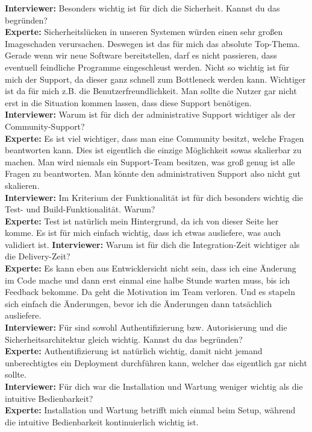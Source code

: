 \begin{center}
\begin{figure}[H]
    \centering
    \label{fig:CEA}
\end{figure}	
\end{center}
\newpage
\resetlinenumber
\begin{linenumbers}
    \textbf{Interviewer:} Besonders wichtig ist für dich die Sicherheit. Kannst du das begründen?\\
    \textbf{Experte:} Sicherheitslücken in unseren Systemen würden einen sehr großen Imageschaden verursachen. Deswegen ist das für mich das absolute Top-Thema. Gerade wenn wir neue Software bereitstellen, darf es nicht passieren, dass eventuell feindliche Programme eingeschleust werden. Nicht so wichtig ist für mich der Support, da dieser ganz schnell zum Bottleneck werden kann. Wichtiger ist da für mich z.B. die Benutzerfreundlichkeit. Man sollte die Nutzer gar nicht erst in die Situation kommen lassen, dass diese Support benötigen.\\
    \textbf{Interviewer:} Warum ist für dich der administrative Support wichtiger als der Community-Support?\\
    \textbf{Experte:} Es ist viel wichtiger, dass man eine Community besitzt, welche Fragen beantworten kann. Dies ist eigentlich die einzige Möglichkeit sowas skalierbar zu machen. Man wird niemals ein Support-Team besitzen, was groß genug ist alle Fragen zu beantworten. Man könnte den administrativen Support also nicht gut skalieren.\\
    \textbf{Interviewer:} Im Kriterium der Funktionalität ist für dich besonders wichtig die Test- und Build-Funktionalität. Warum?\\
    \textbf{Experte:} Test ist natürlich mein Hintergrund, da ich von dieser Seite her komme. Es ist für mich einfach wichtig, dass ich etwas ausliefere, was auch validiert ist. 
    \textbf{Interviewer:} Warum ist für dich die Integration-Zeit wichtiger als die Delivery-Zeit?\\
    \textbf{Experte:} Es kann eben aus Entwicklersicht nicht sein, dass ich eine Änderung im Code mache und dann erst einmal eine halbe Stunde warten muss, bis ich Feedback bekomme. Da geht die Motivation im Team verloren. Und es stapeln sich einfach die Änderungen, bevor ich die Änderungen dann tatsächlich ausliefere.\\
    \textbf{Interviewer:} Für sind sowohl Authentifizierung bzw. Autorisierung und die Sicherheitsarchitektur gleich wichtig. Kannst du das begründen?\\
    \textbf{Experte:} Authentifizierung ist natürlich wichtig, damit nicht jemand unberechtigtes ein Deployment durchführen kann, welcher das eigentlich gar nicht sollte.\\
    \textbf{Interviewer:} Für dich war die Installation und Wartung weniger wichtig als die intuitive Bedienbarkeit?\\
    \textbf{Experte:} Installation und Wartung betrifft mich einmal beim Setup, während die intuitive Bedienbarkeit kontinuierlich wichtig ist.\\
\end{linenumbers}

